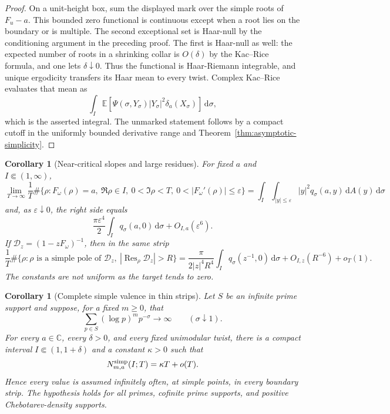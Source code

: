 \documentclass[11pt]{article}
\newtheorem{corollary}[theorem]{Corollary}
\theoremstyle{definition}
\theoremstyle{remark}
\newcommand{\dd}{\,\mathrm d}
\newcommand{\eps}{\varepsilon}
\newcommand{\C}{\mathbb C}
\begin{document}
\begin{proof}
On a unit-height box, sum the displayed mark over the simple roots of $F_u-a$.
This bounded zero functional is continuous except when a root lies on the boundary or
is multiple.  The second exceptional set is Haar-null by the conditioning argument in
the preceding proof.  The first is Haar-null as well: the expected number of roots in
a shrinking collar is $O(\delta)$ by the Kac--Rice formula, and one lets
$\delta\downarrow0$.  Thus the functional is Haar-Riemann integrable, and unique
ergodicity transfers its Haar mean to every twist.  Complex Kac--Rice evaluates that
mean as
\[
 \int_I\mathbb E\!\left[
  \Psi(\sigma,Y_\sigma)|Y_\sigma|^2\delta_a(X_\sigma)
 \right]\dd\sigma,
\]
which is the asserted integral.  The unmarked statement follows by a compact cutoff
in the uniformly bounded derivative range and Theorem~\ref{thm:asymptotic-simplicity}.
\end{proof}

\begin{corollary}[Near-critical slopes and large residues]
\label{cor:near-multiple}
For fixed $a$ and $I\Subset(1,\infty)$,
\[
 \lim_{T\to\infty}\frac1T
 \#\{\rho:F_\omega(\rho)=a,\ \Re\rho\in I,\ 0<\Im\rho<T,
                   \ 0<|F_\omega'(\rho)|\le\eps\}
 =\int_I\int_{|y|\le\eps}|y|^2q_\sigma(a,y)\dd A(y)\dd\sigma
\]
and, as $\eps\downarrow0$, the right side equals
\[
 \frac{\pi\eps^4}{2}\int_Iq_\sigma(a,0)\dd\sigma+O_{I,a}(\eps^6).
\]
If $\mathcal D_z=(1-zF_\omega)^{-1}$, then in the same strip
\[
 \frac1T\#\{\rho:\rho\text{ is a simple pole of }\mathcal D_z,
                   \ |\operatorname {Res}_\rho\mathcal D_z|>R\}
 =\frac{\pi}{2|z|^4R^4}\int_Iq_\sigma(z^{-1},0)\dd\sigma
  +O_{I,z}(R^{-6})+o_T(1).
\]
The constants are not uniform as the target tends to zero.
\end{corollary}

\begin{corollary}[Complete simple valence in thin strips]
\label{cor:thin-strip-valence}
Let $S$ be an infinite prime support and suppose, for a fixed $m\ge0$, that
\[
 \sum_{p\in S}(\log p)^mp^{-\sigma}\longrightarrow\infty
 \qquad(\sigma\downarrow1).
\]
For every $a\in\C$, every $\delta>0$, and every fixed unimodular twist, there is a
compact interval $I\Subset(1,1+\delta)$ and a constant $\kappa>0$ such that
\[
 N^{\rm simp}_{m,a}(I;T)=\kappa T+o(T).
\]
Hence every value is assumed infinitely often, at simple points, in every boundary
strip.  The hypothesis holds for all primes, cofinite prime supports, and positive
Chebotarev-density supports.
\end{corollary}
\end{document}
